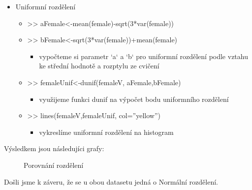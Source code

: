 \documentclass[paper=a4, fontsize=12pt]{scrartcl}
\numberwithin{equation}{section}		%
\numberwithin{figure}{section}			%
\numberwithin{table}{section}				%
\begin{document}
\begin{itemize}
\begin{itemize}
\begin{itemize}
		        \end{itemize}
		\item Uniformní rozdělení
			\begin{itemize}
		        \item >> aFemale<-mean(female)-sqrt(3*var(female))
		        \item >> bFemale<-sqrt(3*var(female))+mean(female)
		                \begin{itemize}
		                \item vypočteme si parametr `a` a `b` pro uniformní rozdělení podle vztahu ke střední hodnotě a rozptylu ze cvičení
		                \end{itemize}
		        \item >> femaleUnif<-dunif(femaleV, aFemale,bFemale)
		                \begin{itemize}
		                \item využijeme funkci dunif na výpočet bodu uniformního rozdělení
		                \end{itemize}
		        \item >> lines(femaleV,femaleUnif, col=''yellow'')
		                \begin{itemize}
		                \item vykreslíme uniformní rozdělení na histogram
		                \end{itemize}
		        \end{itemize}
		\end{itemize}
\end{itemize}
Výsledkem jsou následujíci grafy:%
\begin{figure}[H]%
    \centering
    \qquad
    \caption{Porovnání rozdělení}%
    \label{fig:example}%
\end{figure}
Došli jsme k záveru, že se u obou datasetu jedná o Normální rozdělení.
\end{document}
